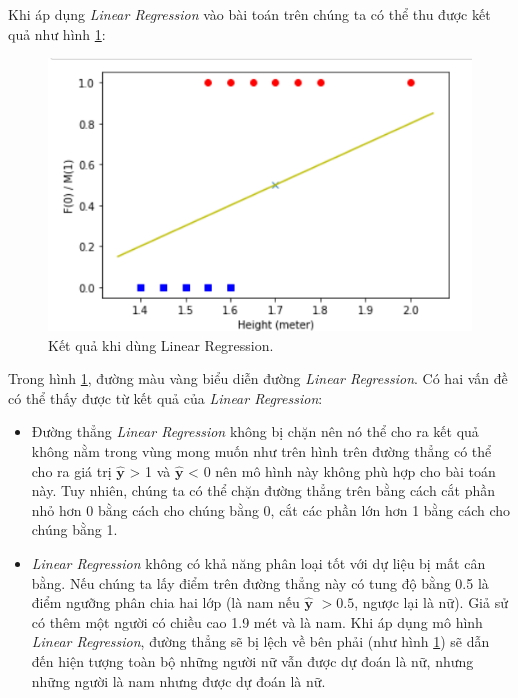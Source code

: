 Khi áp dụng \textit{Linear Regression} vào bài toán trên chúng ta có thể thu được kết quả như hình \ref{fig:lr_result}:
\clearpage
\begin{figure}[!ht]
    \centering
    \includegraphics[width=\textwidth,height=\textheight,keepaspectratio]{chapter02/figure/LN_result.PNG}
    \caption{Kết quả khi dùng Linear Regression.}
    \label{fig:lr_result}
\end{figure}

Trong hình \ref{fig:lr_result}, đường màu vàng biểu diễn đường \textit{Linear Regression}. Có hai vấn đề có thể thấy được từ kết quả của \textit{Linear Regression}:

\begin{itemize}
    \item Đường thẳng \textit{Linear Regression} không bị chặn nên nó thể cho ra kết quả không nằm trong vùng mong muốn như trên hình trên đường thẳng có thể cho ra giá trị $\mathbf{\hat{y}}$ > 1 và $\mathbf{\hat{y}}$ < 0 nên mô hình này không phù hợp cho bài toán này. Tuy nhiên, chúng ta có thể chặn đường thẳng trên bằng cách cắt phần nhỏ hơn 0 bằng cách cho chúng bằng 0, cắt các phần lớn hơn 1 bằng cách cho chúng bằng 1.
    \item \textit{Linear Regression} không có khả năng phân loại tốt với dự liệu bị mất cân bằng. Nếu chúng ta lấy điểm trên đường thẳng này có tung độ bằng 0.5 là điểm ngưỡng phân chia hai lớp (là nam nếu $\mathbf{\hat{y}}$ $> 0.5$, ngược lại là nữ). Giả sử có thêm một người có chiều cao 1.9 mét và là nam. Khi áp dụng mô hình \textit{Linear Regression}, đường thẳng sẽ bị lệch về bên phải (như hình \ref{fig:lr_result}) sẽ dẫn đến hiện tượng toàn bộ những người nữ vẫn được dự đoán là nữ, nhưng những người là nam nhưng được dự đoán là nữ.
\end{itemize}

